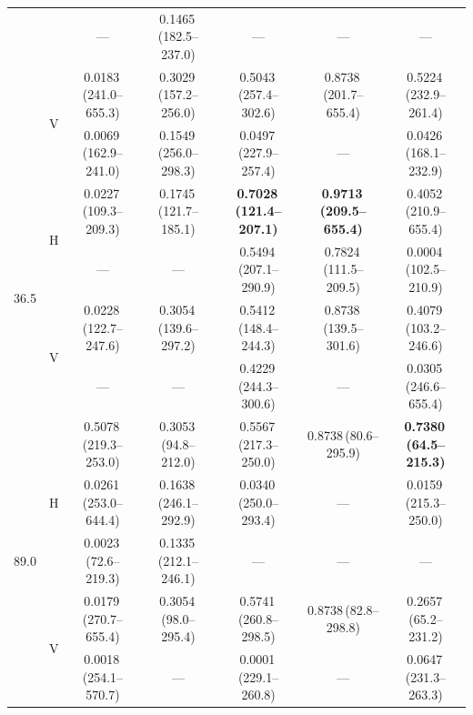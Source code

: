 \documentclass[preprint,review,12pt,authoryear]{elsarticle}
\begin{document}
\begin{table}[p]
{\begin{tabular}{@{}llccccc@{}}
    &   & ---                   & 0.1465\,(182.5--237.0) & ---                   & ---                   & --- \\[6pt]
    & \multirow{2}{*}{V}
        & 0.0183\,(241.0--655.3) & 0.3029\,(157.2--256.0) & 0.5043\,(257.4--302.6) & 0.8738\,(201.7--655.4) & 0.5224\,(232.9--261.4) \\
    &   & 0.0069\,(162.9--241.0) & 0.1549\,(256.0--298.3) & 0.0497\,(227.9--257.4) & ---                   & 0.0426\,(168.1--232.9) \\
\midrule
\multirow{4}{*}{36.5}
    & \multirow{2}{*}{H}
        & 0.0227\,(109.3--209.3) & 0.1745\,(121.7--185.1) & \textbf{0.7028\,(121.4--207.1)} & \textbf{0.9713\,(209.5--655.4)} & 0.4052\,(210.9--655.4) \\
    &   & ---                   & ---                   & 0.5494\,(207.1--290.9) & 0.7824\,(111.5--209.5) & 0.0004\,(102.5--210.9) \\[6pt]
    & \multirow{2}{*}{V}
        & 0.0228\,(122.7--247.6) & 0.3054\,(139.6--297.2) & 0.5412\,(148.4--244.3) & 0.8738\,(139.5--301.6) & 0.4079\,(103.2--246.6) \\
    &   & ---                   & ---                   & 0.4229\,(244.3--300.6) & ---                   & 0.0305\,(246.6--655.4) \\
\midrule
\multirow{5}{*}{89.0}
    & \multirow{3}{*}{H}
        & 0.5078\,(219.3--253.0) & 0.3053\,(94.8--212.0)  & 0.5567\,(217.3--250.0) & 0.8738\,(80.6--295.9)  & \textbf{0.7380\,(64.5--215.3)}  \\
    &   & 0.0261\,(253.0--644.4) & 0.1638\,(246.1--292.9) & 0.0340\,(250.0--293.4) & ---                   & 0.0159\,(215.3--250.0) \\
    &   & 0.0023\,(72.6--219.3)  & 0.1335\,(212.1--246.1) & ---                   & ---                   & ---\\[6pt]
    & \multirow{2}{*}{V}
        & 0.0179\,(270.7--655.4) & 0.3054\,(98.0--295.4)  & 0.5741\,(260.8--298.5) & 0.8738\,(82.8--298.8)  & 0.2657\,(65.2--231.2)  \\
    &   & 0.0018\,(254.1--570.7) & ---                   & 0.0001\,(229.1--260.8) & ---                   & 0.0647\,(231.3--263.3) \\
\bottomrule
\end{tabular}}
\end{table}
\end{document}

